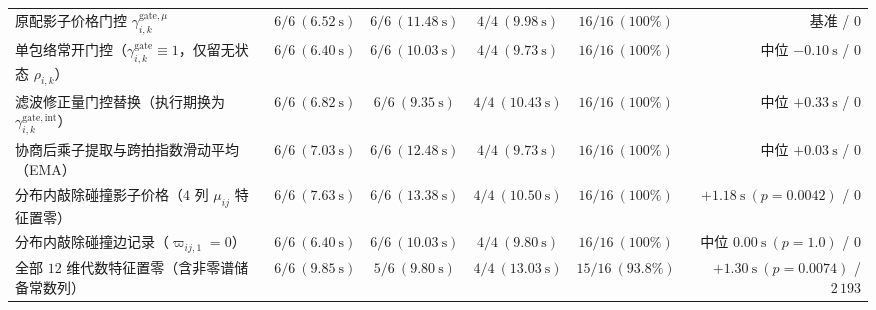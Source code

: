 \begin{table}[t]
\begin{tabularx}{\textwidth}{@{}Xccccr@{}}
 \midrule
 原配影子价格门控 $\gamma_{i,k}^{\mathrm{gate},\mu}$ & $6/6\ (6.52\ \mathrm s)$ & $6/6\ (11.48\ \mathrm s)$ & $4/4\ (9.98\ \mathrm s)$ & $16/16\ (100\%)$ & 基准 / $0$\\
 单包络常开门控（$\gamma_{i,k}^{\mathrm{gate}}\equiv 1$，仅留无状态 $\rho_{i,k}$） & $6/6\ (6.40\ \mathrm s)$ & $6/6\ (10.03\ \mathrm s)$ & $4/4\ (9.73\ \mathrm s)$ & $16/16\ (100\%)$ & 中位 $-0.10\ \mathrm s$ / $0$\\
 滤波修正量门控替换（执行期换为 $\gamma_{i,k}^{\mathrm{gate,int}}$） & $6/6\ (6.82\ \mathrm s)$ & $6/6\ (9.35\ \mathrm s)$ & $4/4\ (10.43\ \mathrm s)$ & $16/16\ (100\%)$ & 中位 $+0.33\ \mathrm s$ / $0$\\
 协商后乘子提取与跨拍指数滑动平均（EMA） & $6/6\ (7.03\ \mathrm s)$ & $6/6\ (12.48\ \mathrm s)$ & $4/4\ (9.73\ \mathrm s)$ & $16/16\ (100\%)$ & 中位 $+0.03\ \mathrm s$ / $0$\\
 分布内敲除碰撞影子价格（$4$ 列 $\mu_{ij}$ 特征置零） & $6/6\ (7.63\ \mathrm s)$ & $6/6\ (13.38\ \mathrm s)$ & $4/4\ (10.50\ \mathrm s)$ & $16/16\ (100\%)$ & $\mathbf{+1.18\ \mathrm s}\ (p=0.0042)$ / $0$\\
 分布内敲除碰撞边记录（$\varpi_{ij,1}=0$） & $6/6\ (6.40\ \mathrm s)$ & $6/6\ (10.03\ \mathrm s)$ & $4/4\ (9.80\ \mathrm s)$ & $16/16\ (100\%)$ & 中位 $0.00\ \mathrm s\ (p=1.0)$ / $0$\\
 全部 $12$ 维代数特征置零（含非零谱储备常数列） & $6/6\ (9.85\ \mathrm s)$ & $5/6\ (9.80\ \mathrm s)$ & $4/4\ (13.03\ \mathrm s)$ & $15/16\ (93.8\%)$ & $+1.30\ \mathrm s\ (p=0.0074)$ / $2\,193$\\
 \bottomrule
 \end{tabularx}
\end{table}

